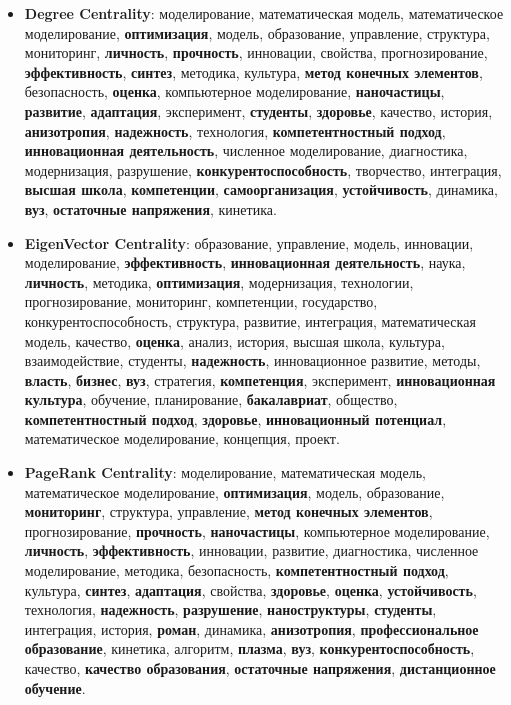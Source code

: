 \begin{itemize}
    \item \textbf{Degree Centrality}: моделирование, математическая модель, математическое моделирование, \textbf{оптимизация}, модель, образование, управление, структура, мониторинг, \textbf{личность}, \textbf{прочность}, инновации, свойства, прогнозирование, \textbf{эффективность}, \textbf{синтез}, методика, культура, \textbf{метод конечных элементов}, безопасность, \textbf{оценка}, компьютерное моделирование, \textbf{наночастицы}, \textbf{развитие}, \textbf{адаптация}, эксперимент, \textbf{студенты}, \textbf{здоровье}, качество, история, \textbf{анизотропия}, \textbf{надежность}, технология, \textbf{компетентностный подход}, \textbf{инновационная деятельность}, численное моделирование, диагностика, модернизация, разрушение, \textbf{конкурентоспособность}, творчество, интеграция, \textbf{высшая школа}, \textbf{компетенции}, \textbf{самоорганизация}, \textbf{устойчивость}, динамика, \textbf{вуз}, \textbf{остаточные напряжения}, кинетика.
    \item \textbf{EigenVector Centrality}: образование, управление, модель, инновации, моделирование, \textbf{эффективность}, \textbf{инновационная деятельность}, наука, \textbf{личность}, методика, \textbf{оптимизация}, модернизация, технологии, прогнозирование, мониторинг, компетенции, государство, конкурентоспособность, структура, развитие, интеграция, математическая модель, качество, \textbf{оценка}, анализ, история, высшая школа, культура, взаимодействие, студенты, \textbf{надежность}, инновационное развитие, методы, \textbf{власть}, \textbf{бизнес}, \textbf{вуз}, стратегия, \textbf{компетенция}, эксперимент, \textbf{инновационная культура}, обучение, планирование, \textbf{бакалавриат}, общество, \textbf{компетентностный подход}, \textbf{здоровье}, \textbf{инновационный потенциал}, математическое моделирование, концепция, проект.
    \item \textbf{PageRank Centrality}: моделирование, математическая модель, математическое моделирование, \textbf{оптимизация}, модель, образование, \textbf{мониторинг}, структура, управление, \textbf{метод конечных элементов}, прогнозирование, \textbf{прочность}, \textbf{наночастицы}, компьютерное моделирование, \textbf{личность}, \textbf{эффективность}, инновации, развитие, диагностика, численное моделирование, методика, безопасность, \textbf{компетентностный подход}, культура, \textbf{синтез}, \textbf{адаптация}, свойства, \textbf{здоровье}, \textbf{оценка}, \textbf{устойчивость}, технология, \textbf{надежность}, \textbf{разрушение}, \textbf{наноструктуры}, \textbf{студенты}, интеграция, история, \textbf{роман}, динамика, \textbf{анизотропия}, \textbf{профессиональное образование}, кинетика, алгоритм, \textbf{плазма}, \textbf{вуз}, \textbf{конкурентоспособность}, качество, \textbf{качество образования}, \textbf{остаточные напряжения}, \textbf{дистанционное обучение}.
\end{itemize}

